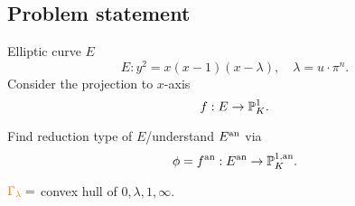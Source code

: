 \subsection{Problem statement} \label{sec:problem_statement}
\begin{frame}
	\begin{minipage}[t]{.7\textwidth}
	Elliptic curve $E$	
	\[
		E: y^2 = x(x-1)(x-\lambda), \quad \lambda = u\cdot \pi^{n}
	.\] 
	Consider the projection to $x$-axis 
	\[
	f: E \to \mathbb P^{1}_K
	.\] 
	\end{minipage}
	\begin{minipage}[t]{.29\textwidth}
	\end{minipage}

	\pause

	\begin{question}
	Find reduction type of $E$/understand $E{}^{\text{an}}$ via \[
	\phi = f{}^{\text{an}} : E{}^{\text{an}} \to \mathbb P^{1, \text{an}}_K
	.\] 
	\end{question}

\end{frame}
\begin{frame}
	${\color{orange} \Gamma_\lambda} = $ convex hull of $0, \lambda, 1, \infty$.
\begin{figure}[ht]
    \centering
\end{figure}
\end{frame}



